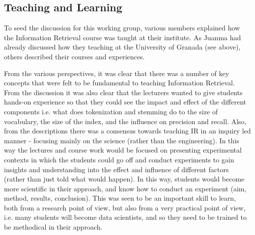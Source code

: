 \subsection{Teaching and Learning}
\label{sec:teaching}

To seed the discussion for this working group, various members explained how the Information Retrieval course was taught at their institute. As Juanma had already discussed how they teaching at the University of Granada (see above), others described their courses and experiences. 





\noindent
From the various perspectives, it was clear that there was a number of key concepts that were felt to be fundamental to teaching Information Retrieval. From the discussion it was also clear that the lecturers wanted to give students hands-on experience so that they could see the impact and effect of the different components i.e. what does tokenization and stemming do to the size of vocabulary, the size of the index, and the influence on precision and recall. Also, from the descriptions there was a consensus towards teaching IR in an inquiry led manner - focusing mainly on the science (rather than the engineering). In this way the lectures and course work would be focused on presenting experimental contexts in which the students could go off and conduct experiments to gain insights and understanding into the effect and influence of different factors (rather than just told what would happen). In this way, students would become more scientific in their approach, and know how to conduct an experiment (aim, method, results, conclusion). This was seen to be an important skill to learn, both from a research point of view, but also from a very practical point of view, i.e. many students will become data scientists, and so they need to be trained to be methodical in their approach.

